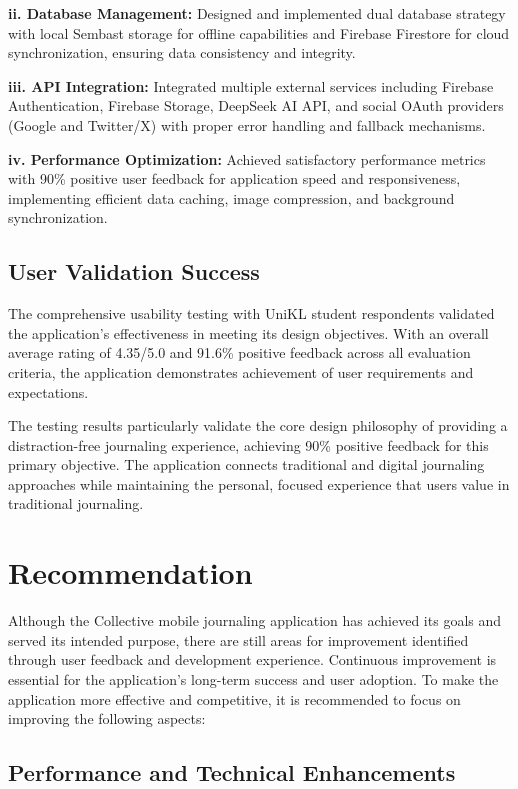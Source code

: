 \textbf{ii. Database Management:} Designed and implemented dual database strategy with local Sembast storage for offline capabilities and Firebase Firestore for cloud synchronization, ensuring data consistency and integrity.

\textbf{iii. API Integration:} Integrated multiple external services including Firebase Authentication, Firebase Storage, DeepSeek AI API, and social OAuth providers (Google and Twitter/X) with proper error handling and fallback mechanisms.

\textbf{iv. Performance Optimization:} Achieved satisfactory performance metrics with 90\% positive user feedback for application speed and responsiveness, implementing efficient data caching, image compression, and background synchronization.

\subsection{User Validation Success}

The comprehensive usability testing with UniKL student respondents validated the application's effectiveness in meeting its design objectives. With an overall average rating of 4.35/5.0 and 91.6\% positive feedback across all evaluation criteria, the application demonstrates achievement of user requirements and expectations.

The testing results particularly validate the core design philosophy of providing a distraction-free journaling experience, achieving 90\% positive feedback for this primary objective. The application connects traditional and digital journaling approaches while maintaining the personal, focused experience that users value in traditional journaling.

\section{Recommendation}\label{sec:recommendation}

Although the Collective mobile journaling application has achieved its goals and served its intended purpose, there are still areas for improvement identified through user feedback and development experience. Continuous improvement is essential for the application's long-term success and user adoption. To make the application more effective and competitive, it is recommended to focus on improving the following aspects:

\subsection{Performance and Technical Enhancements}

